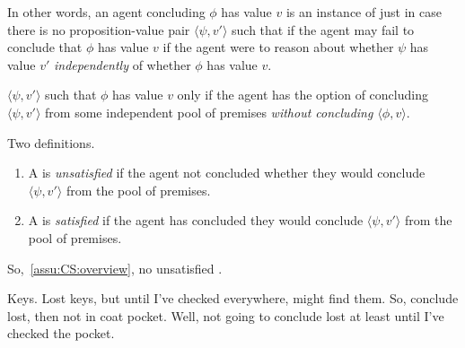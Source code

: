\begin{note}[\csN{2}]
  In other words, an agent concluding \(\phi\) has value \(v\) is an instance of \csN{} just in case there is no proposition-value pair \(\langle \psi, v' \rangle\) such that if the agent may fail to conclude that \(\phi\) has value \(v\) if the agent were to reason about whether \(\psi\) has value \(v'\) \emph{independently} of whether \(\phi\) has value \(v\).
\end{note}

\begin{note}[\requ{3}]
  \begin{notion}
    \(\langle \psi, v' \rangle\) such that \(\phi\) has value \(v\) only if the agent has the option of concluding \(\langle \psi, v' \rangle\) from some independent pool of premises \emph{without concluding \(\langle \phi, v \rangle\)}.
  \end{notion}

  \begin{notion}
    Two definitions.

    \begin{enumerate}
    \item
      A \requ{} is \emph{unsatisfied} if the agent not concluded whether they would conclude \(\langle \psi, v' \rangle\) from the pool of premises.
    \item
      A \requ{} is \emph{satisfied} if the agent has concluded they would conclude \(\langle \psi, v' \rangle\) from the pool of premises.
    \end{enumerate}
    \vspace{-\baselineskip}
  \end{notion}

  So,~\autoref{assu:CS:overview}, no unsatisfied .

  Keys.
  Lost keys, but until I've checked everywhere, might find them.
  So, conclude lost, then not in coat pocket.
  Well, not going to conclude lost at least until I've checked the pocket.
\end{note}

